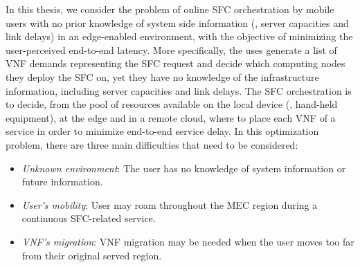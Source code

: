 In this thesis, we consider the problem of online SFC orchestration by mobile users with no prior knowledge of system side information (\ie, server capacities and link delays) in an edge-enabled environment, with the objective of minimizing the user-perceived end-to-end latency. More specifically, the uses generate a list of VNF demands representing the SFC request and decide which computing nodes they deploy the SFC on, yet they have no knowledge of the infrastructure information, including server capacities and link delays. The SFC orchestration is to decide, from the pool of resources available on the local device (\ie, hand-held equipment), at the edge and in a remote cloud, where to place each VNF of a service in order to minimize end-to-end service delay. In this optimization problem, there are three main difficulties that need to be considered:
\begin{itemize}
	\item \textit{Unknown environment}: The user has no knowledge of system information or future information.
	\item \textit{User's mobility}: User may roam throughout the MEC region during a continuous SFC-related service.
	\item \textit{VNF's migration}: VNF migration may be needed when the user moves too far from their original served region.
\end{itemize}



